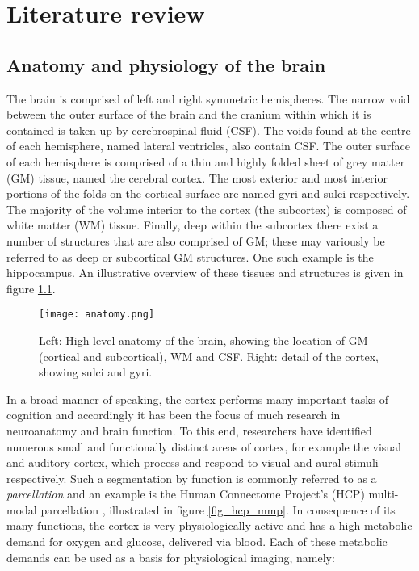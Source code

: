  

\chapter{Literature review}
\label{lit_review_chapter}

\section{Anatomy and physiology of the brain}

The brain is comprised of left and right symmetric hemispheres. The narrow void between the outer surface of the brain and the cranium within which it is contained is taken up by cerebrospinal fluid (CSF). The voids found at the centre of each hemisphere, named lateral ventricles, also contain CSF. The outer surface of each hemisphere is comprised of a thin and highly folded sheet of grey matter (GM) tissue, named the cerebral cortex. The most exterior and most interior portions of the folds on the cortical surface are named gyri and sulci respectively. The majority of the volume interior to the cortex (the subcortex) is composed of white matter (WM) tissue. Finally, deep within the subcortex there exist a number of structures that are also comprised of GM; these may variously be referred to as deep or subcortical GM structures. One such example is the hippocampus. An illustrative overview of these tissues and structures is given in figure \ref{anatomy}. 

\begin{figure}
\centering
\texttt{[image: anatomy.png]}
\caption{Left: High-level anatomy of the brain, showing the location of GM (cortical and subcortical), WM and CSF. Right: detail of the cortex, showing sulci and gyri.}
\label{anatomy}
\end{figure}

In a broad manner of speaking, the cortex performs many important tasks of cognition and accordingly it has been the focus of much research in neuroanatomy and brain function. To this end, researchers have identified numerous small and functionally distinct areas of cortex, for example the visual and auditory cortex, which process and respond to visual and aural stimuli respectively. Such a segmentation by function is commonly referred to as a \textit{parcellation} and an example is the Human Connectome Project's (HCP) multi-modal parcellation \cite{Glasser2016}, illustrated in figure \ref{fig_hcp_mmp}. In consequence of its many functions, the cortex is very physiologically active and has a high metabolic demand for oxygen and glucose, delivered via blood. Each of these metabolic demands can be used as a basis for physiological imaging, namely: 

